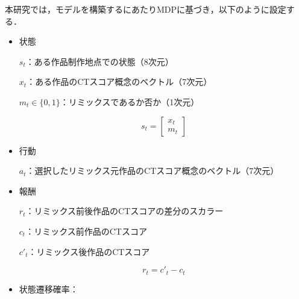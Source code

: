 \documentclass[submit,techrep,noauthor]{ipsj}
\begin{document}
本研究では，モデルを構築するにあたりMDPに基づき，以下のように設定する．

\begin{itemize}
  \item 状態
    
    $s_t$：ある作品制作地点での状態（8次元）

    $x_t$：ある作品のCTスコア概念のベクトル（7次元）

    $m_t\in\{0,1\}$：リミックスであるか否か（1次元）

    \begin{equation}
        s_t = 
        \begin{bmatrix}
           x_t \\
           m_t 
        \end{bmatrix}
    \end{equation}

  \item 行動

    $a_t$：選択したリミックス元作品のCTスコア概念のベクトル（7次元）

  
  \item 報酬

    $r_t$：リミックス前後作品のCTスコアの差分のスカラー
    
    $c_t$：リミックス前作品のCTスコア

    $c'_t$：リミックス後作品のCTスコア
    
    \begin{equation}
        r_t = c'_t - c_t
    \end{equation}

    

    
  
  \item 状態遷移確率：
\end{itemize}


\end{document}
